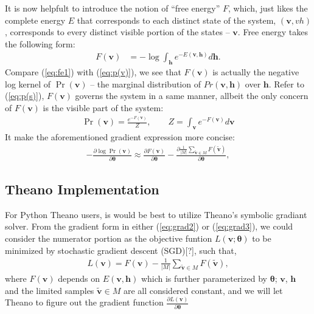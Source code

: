 \documentclass[11pt]{article}
\newcommand{\vh}{\boldsymbol{h}}
\newcommand{\vv}{\boldsymbol{v}}
\newcommand{\vvt}{\tilde{\vv}}
\newcommand{\pEC}{\boldsymbol{\theta}}
\newcommand{\PDV}[2]{\frac{\partial #1}{\partial #2}}
\begin{document}
{It is now helpfult to introduce the notion of ``free energy'' $F$, which, just likes the complete energy $E$ that corresponds to each distinct state of the system, $(\vv, vh)$, corresponds to every distinct visible portion of the states -- $\vv$. Free energy takes the following form:
\begin{equation}\label{eq:fe1}
  \begin{split}
    F(\vv) &= -\log{\int_{\vh}{e^{-E(\vv, \vh)}d\vh}}.
  \end{split}
\end{equation}
Compare (\ref{eq:fe1}) with (\ref{eq:p(v)}), we see that $F(\vv)$ is actually the negative log kernel of $\Pr(\vv)$ -- the marginal distribution of $Pr(\vv, \vh)$ over $\vh$. Refer to (\ref{eq:p(s)}), $F(\vv)$ governs the system in a same manner, allbeit the only concern of $F(\vv)$ is the visible part of the system:
\begin{equation}\label{eq:fe2}
  \begin{split}
    \Pr(\vv) = \frac{e^{-F(\vv)}}{Z}, \quad\quad Z=\int_{\vv}{e^{-F(\vv)}}d\vv
  \end{split}
\end{equation}
It make the aforementioned gradient expression more concise:
\begin{align}\label{eq:grad3}
  -\PDV{\log{\Pr(\vv)}}{\pEC} \approx \PDV{F(\vv)}{\pEC} - \PDV{\frac{1}{|M|}\sum_{\vvt \in M}{F(\vvt)}}{\pEC},
\end{align}
\subsection{Theano Implementation}
For Python Theano users, is would be best to utilize Theano's symbolic gradiant solver. From the gradient form in either (\ref{eq:grad2}) or (\ref{eq:grad3}), we could consider the numerator portion as the objective funtion $L(\vv; \pEC)$ to be minimized by stochastic gradient descent (SGD)[?], such that,
\begin{align}
  L(\vv) = F(\vv) - \frac{1}{|M|}\sum_{\vvt \in M}{F(\vvt)},
\end{align}
where $F(\vv)$ depends on $E(\vv, \vh)$ which is further parameterized by $\pEC$; $\vv$, $\vh$ and the limited samples $\vvt \in M$ are all considered constant, and we will let Theano to figure out the gradient function $\PDV{L(\vv)}{\pEC}$

}
\end{document}
